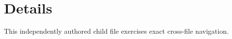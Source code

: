 \section{Details}\label{sec:details}
This independently authored child file exercises exact cross-file navigation.
